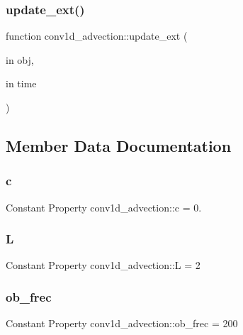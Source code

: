 \subsubsection{\texorpdfstring{update\+\_\+ext()}{update\_ext()}}
{\footnotesize\ttfamily function conv1d\+\_\+advection\+::update\+\_\+ext (\begin{DoxyParamCaption}\item[{in}]{obj,  }\item[{in}]{time }\end{DoxyParamCaption})}



\subsection{Member Data Documentation}
\mbox{\label{classconv1d__advection_adebbab228153451655990cf9dc3ecc61}} 
\subsubsection{\texorpdfstring{c}{c}}
{\footnotesize\ttfamily Constant Property conv1d\+\_\+advection\+::c = 0.}

\mbox{\label{classconv1d__advection_aa2e5365b62230da10a6ad2b51075f775}} 
\subsubsection{\texorpdfstring{L}{L}}
{\footnotesize\ttfamily Constant Property conv1d\+\_\+advection\+::L = 2}

\mbox{\label{classconv1d__advection_a54fb1aca5b022935bf81f97fb2f70551}} 
\subsubsection{\texorpdfstring{ob\+\_\+frec}{ob\_frec}}
{\footnotesize\ttfamily Constant Property conv1d\+\_\+advection\+::ob\+\_\+frec = 200}

